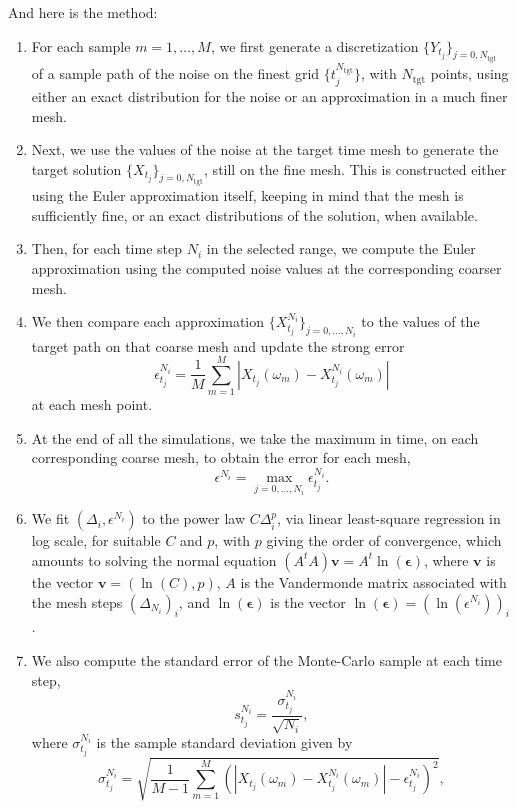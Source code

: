 \documentclass[reqno,12pt]{amsart}
\theoremstyle{plain} %
\theoremstyle{definition} %
\begin{document}
And here is the method:
\begin{enumerate}
    \item For each sample $m=1, \ldots, M$, we first generate a discretization $\{Y_{t_j}\}_{j=0, N_{\mathrm{tgt}}}$ of a sample path of the noise on the finest grid $\{t_j^{N_{\mathrm{tgt}}}\}$, with $N_{\mathrm{tgt}}$ points, using either an exact distribution for the noise or an approximation in a much finer mesh.
    \item Next, we use the values of the noise at the target time mesh to generate the target solution $\{X_{t_j}\}_{j=0, N_{\mathrm{tgt}}}$, still on the fine mesh. This is constructed either using the Euler approximation itself, keeping in mind that the mesh is sufficiently fine, or an exact distributions of the solution, when available.
    \item Then, for each time step $N_i$ in the selected range, we compute the Euler approximation using the computed noise values at the corresponding coarser mesh.
    \item We then compare each approximation $\{X_{t_j}^{N_i}\}_{j=0, \ldots, N_i}$ to the values of the target path on that coarse mesh and update the strong error
    \[
        \epsilon_{t_j}^{N_i} = \frac{1}{M}\sum_{m=1}^M \left|X_{t_j}(\omega_m) - X_{t_j}^{N_i}(\omega_m)\right|
    \]
    at each mesh point.
    \item At the end of all the simulations, we take the maximum in time, on each corresponding coarse mesh, to obtain the error for each mesh,
    \[
        \epsilon^{N_i} = \max_{j=0, \ldots, N_i} \epsilon_{t_j}^{N_i}.
    \]
    \item We fit $(\Delta_i, \epsilon^{N_i})$ to the power law $C\Delta_i^p$, via linear least-square regression in log scale, for suitable $C$ and $p$, with $p$ giving the order of convergence, which amounts to solving the normal equation $(A^tA)\mathbf{v} = A^t\ln(\boldsymbol{\epsilon})$, where $\mathbf{v}$ is the vector $\mathbf{v} = (\ln(C), p)$, $A$ is the Vandermonde matrix associated with the mesh steps $(\Delta_{N_i})_i$, and $\ln(\boldsymbol{\epsilon})$ is the vector $\ln(\boldsymbol{\epsilon}) = (\ln(\epsilon^{N_i}))_i$.
    \item We also compute the standard error of the Monte-Carlo sample at each time step,
    \[
        s_{t_j}^{N_i} = \frac{\sigma_{t_j}^{N_i}}{\sqrt{N_i}},
    \]
    where $\sigma_{t_j}^{N_i}$ is the sample standard deviation given by
    \[
        \sigma_{t_j}^{N_i} = \sqrt{\frac{1}{M-1}\sum_{m=1}^M \left(\left|X_{t_j}(\omega_m) - X_{t_j}^{N_i}(\omega_m) \right|- \epsilon_{t_j}^{N_i}\right)^2},
\]
\end{enumerate}
\end{document}
